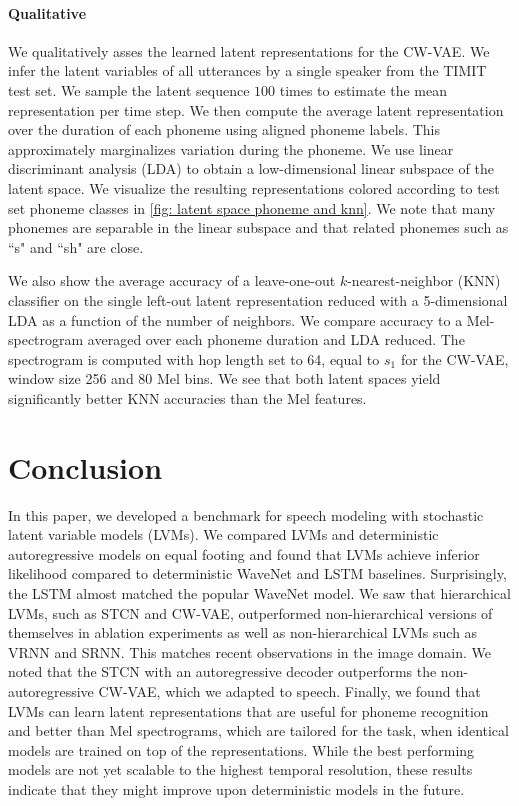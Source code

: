 \paragraph{Qualitative}
We qualitatively asses the learned latent representations for the CW-VAE. 
We infer the latent variables of all utterances by a single speaker from the TIMIT test set. We sample the latent sequence $100$ times to estimate the mean representation per time step. We then compute the average latent representation over the duration of each phoneme using aligned phoneme labels. This approximately marginalizes variation during the phoneme. We use linear discriminant analysis (LDA) \cite{fisher_use_1936} to obtain a low-dimensional linear subspace of the latent space. 
We visualize the resulting representations colored according to test set phoneme classes in \cref{fig: latent space phoneme and knn}. We note that many phonemes are separable in the linear subspace and that related phonemes such as ``s" and ``sh" are close.

We also show the average accuracy of a leave-one-out $k$-nearest-neighbor (KNN) classifier on the single left-out latent representation reduced with a 5-dimensional LDA as a function of the number of neighbors. 
We compare accuracy to a Mel-spectrogram averaged over each phoneme duration and LDA reduced. The spectrogram is computed with hop length set to 64, equal to $s_1$ for the CW-VAE, window size 256 and 80 Mel bins.
We see that both latent spaces yield significantly better KNN accuracies than the Mel features.


\section{Conclusion}
In this paper, we developed a benchmark for speech modeling with stochastic latent variable models (LVMs). 
We compared LVMs and deterministic autoregressive models on equal footing and found that LVMs achieve inferior likelihood compared to deterministic WaveNet and LSTM baselines. Surprisingly, the LSTM almost matched the popular WaveNet model. 
We saw that hierarchical LVMs, such as STCN and CW-VAE, outperformed non-hierarchical versions of themselves in ablation experiments as well as non-hierarchical LVMs such as VRNN and SRNN. This matches recent observations in the image domain. 
We noted that the STCN with an autoregressive decoder outperforms the non-autoregressive CW-VAE, which we adapted to speech. 
Finally, we found that LVMs can learn latent representations that are useful for phoneme recognition and better than Mel spectrograms, which are tailored for the task, when identical models are trained on top of the representations.
While the best performing models are not yet scalable to the highest temporal resolution, these results indicate that they might improve upon deterministic models in the future. 


